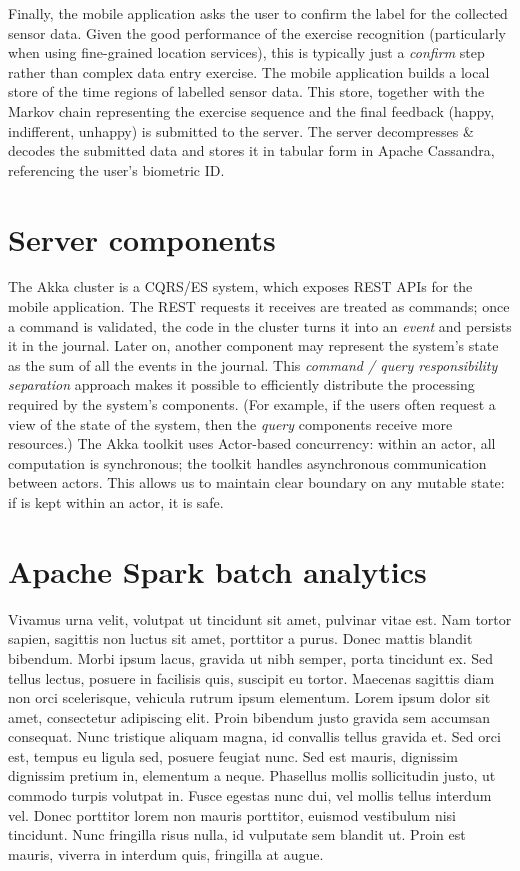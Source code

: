 \documentclass[a4paper, 10 pt, conference]{IEEEtran}
\begin{document}
Finally, the mobile application asks the user to confirm the label for the collected sensor data. Given the good performance of the exercise recognition (particularly when using fine-grained location services), this is typically just a \emph{confirm} step rather than complex data entry exercise. The mobile application builds a local store of the time regions of labelled sensor data. This store, together with the Markov chain representing the exercise sequence and the final feedback (happy, indifferent, unhappy) is submitted to the server. The server decompresses \& decodes the submitted data and stores it in tabular form in Apache Cassandra, referencing the user's biometric ID. 

\section{Server components}

The Akka cluster is a CQRS/ES system, which exposes REST APIs for the mobile application. The REST requests it receives are treated as commands; once a command is validated, the code in the cluster turns it into an \emph{event} and persists it in the journal. Later on, another component may represent the system's state as the sum of all the events in the journal. This \emph{command / query responsibility separation} approach makes it possible to efficiently distribute the processing required by the system's components. (For example, if the users often request a view of the state of the system, then the \emph{query} components receive more resources.) The Akka toolkit uses Actor-based concurrency: within an actor, all computation is synchronous; the toolkit handles asynchronous communication between actors. This allows us to maintain clear boundary on any mutable state: if is kept within an actor, it is safe. 

\section{Apache Spark batch analytics}

Vivamus urna velit, volutpat ut tincidunt sit amet, pulvinar vitae est. Nam tortor sapien, sagittis non luctus sit amet, porttitor a purus. Donec mattis blandit bibendum. Morbi ipsum lacus, gravida ut nibh semper, porta tincidunt ex. Sed tellus lectus, posuere in facilisis quis, suscipit eu tortor. Maecenas sagittis diam non orci scelerisque, vehicula rutrum ipsum elementum. Lorem ipsum dolor sit amet, consectetur adipiscing elit. Proin bibendum justo gravida sem accumsan consequat. Nunc tristique aliquam magna, id convallis tellus gravida et. Sed orci est, tempus eu ligula sed, posuere feugiat nunc. Sed est mauris, dignissim dignissim pretium in, elementum a neque. Phasellus mollis sollicitudin justo, ut commodo turpis volutpat in. Fusce egestas nunc dui, vel mollis tellus interdum vel. Donec porttitor lorem non mauris porttitor, euismod vestibulum nisi tincidunt. Nunc fringilla risus nulla, id vulputate sem blandit ut. Proin est mauris, viverra in interdum quis, fringilla at augue.
\end{document}
